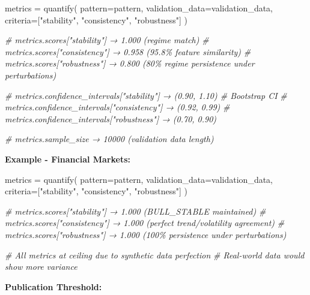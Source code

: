 \documentclass[
]{article}
\newenvironment{Shaded}{}{}
\newcommand{\CommentTok}[1]{\textcolor[rgb]{0.38,0.63,0.69}{\textit{#1}}}
\newcommand{\NormalTok}[1]{#1}
\newcommand{\OperatorTok}[1]{\textcolor[rgb]{0.40,0.40,0.40}{#1}}
\newcommand{\StringTok}[1]{\textcolor[rgb]{0.25,0.44,0.63}{#1}}
\begin{document}
\begin{Shaded}
\begin{Highlighting}[]
\NormalTok{metrics }\OperatorTok{=}\NormalTok{ quantify(}
\NormalTok{    pattern}\OperatorTok{=}\NormalTok{pattern,}
\NormalTok{    validation\_data}\OperatorTok{=}\NormalTok{validation\_data,}
\NormalTok{    criteria}\OperatorTok{=}\NormalTok{[}\StringTok{"stability"}\NormalTok{, }\StringTok{"consistency"}\NormalTok{, }\StringTok{"robustness"}\NormalTok{]}
\NormalTok{)}

\CommentTok{\# metrics.scores["stability"] → 1.000 (regime match)}
\CommentTok{\# metrics.scores["consistency"] → 0.958 (95.8\% feature similarity)}
\CommentTok{\# metrics.scores["robustness"] → 0.800 (80\% regime persistence under perturbations)}

\CommentTok{\# metrics.confidence\_intervals["stability"] → (0.90, 1.10)  \# Bootstrap CI}
\CommentTok{\# metrics.confidence\_intervals["consistency"] → (0.92, 0.99)}
\CommentTok{\# metrics.confidence\_intervals["robustness"] → (0.70, 0.90)}

\CommentTok{\# metrics.sample\_size → 10000 (validation data length)}
\end{Highlighting}
\end{Shaded}

\textbf{Example - Financial Markets:}

\begin{Shaded}
\begin{Highlighting}[]
\NormalTok{metrics }\OperatorTok{=}\NormalTok{ quantify(}
\NormalTok{    pattern}\OperatorTok{=}\NormalTok{pattern,}
\NormalTok{    validation\_data}\OperatorTok{=}\NormalTok{validation\_data,}
\NormalTok{    criteria}\OperatorTok{=}\NormalTok{[}\StringTok{"stability"}\NormalTok{, }\StringTok{"consistency"}\NormalTok{, }\StringTok{"robustness"}\NormalTok{]}
\NormalTok{)}

\CommentTok{\# metrics.scores["stability"] → 1.000 (BULL\_STABLE maintained)}
\CommentTok{\# metrics.scores["consistency"] → 1.000 (perfect trend/volatility agreement)}
\CommentTok{\# metrics.scores["robustness"] → 1.000 (100\% persistence under perturbations)}

\CommentTok{\# All metrics at ceiling due to synthetic data perfection}
\CommentTok{\# Real{-}world data would show more variance}
\end{Highlighting}
\end{Shaded}

\textbf{Publication Threshold:}
\end{document}
